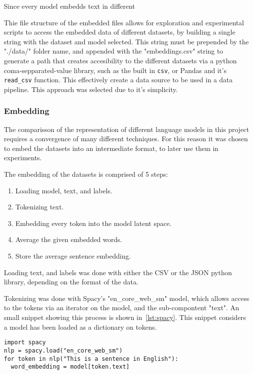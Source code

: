 Since every model embedds text in different

Thie file structure of the embedded files allows for exploration and experimental scripts to access the embedded data of different datasets, by building a single string with the dataset and model selected. This string must be prepended by the "./data/" folder name, and appended with the "embeddings.csv" string to generate a path that creates accesibility to the different datasets via a python coma-sepparated-value library, such as the built in \lstinline{csv}, or Pandas \cite{TODO} and it's \lstinline{read_csv} function. This effectively create a data source to be used in a data pipeline. This approach was selected due to it's simplicity.

\subsubsection{Embedding}\label{subs:Embedding}
The comparisson of the representation of different language models in this project requires a convergence of many different techniques. For this reason it was chosen to embed the datasets into an intermediate format, to later use them in experiments.

The embedding of the datasets is comprised of 5 steps:

\begin{enumerate}
  \item Loading model, text, and labels.
  \item Tokenizing text.
  \item Embedding every token into the model latent space.
  \item Average the given embedded words.
  \item Store the average sentence embedding.
\end{enumerate}

Loading text, and labels was done with either the CSV\cite{TODO} or the JSON\cite{TODO} python library, depending on the format of the data.

Tokenizing was done with Spacy's "en_core_web_sm" model, which allows access to the tokens via an iterator on the model, and the sub-compontent "text". An small snippet showing this process is shown in~\ref{lst:spacy}. This snippet considers a model has been loaded as a dictionary on tokens.

\begin{lstlisting}[caption={Tokenizing with Spacy},label=lst:spacy,frame=single]
import spacy
nlp = spacy.load("en_core_web_sm")
for token in nlp("This is a sentence in English"):
  word_embedding = model[token.text]
\end{lstlisting}

